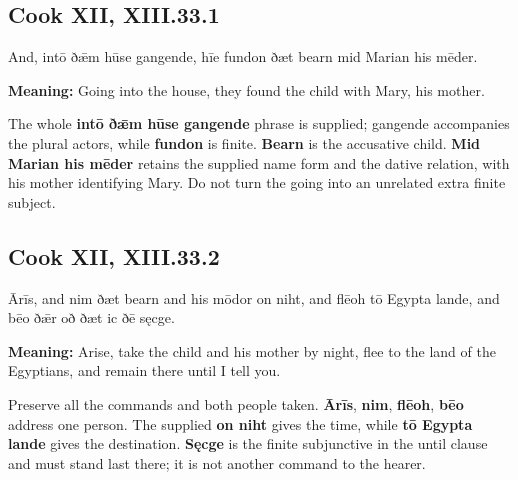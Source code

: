 \par\begin{minipage}{\linewidth}\raggedright
\subsection*{Cook XII, XIII.33.1}

And, intō ðǣm hūse gangende, hīe fundon ðæt bearn mid Marian his mēder.

\textbf{Meaning:} Going into the house, they found the child with Mary, his mother.

The whole \textbf{intō ðǣm hūse gangende} phrase is supplied; gangende accompanies the plural actors, while \textbf{fundon} is finite. \textbf{Bearn} is the accusative child. \textbf{Mid Marian his mēder} retains the supplied name form and the dative relation, with his mother identifying Mary. Do not turn the going into an unrelated extra finite subject.

\end{minipage}\par\addvspace{4pt}

\par\begin{minipage}{\linewidth}\raggedright
\subsection*{Cook XII, XIII.33.2}

Ārīs, and nim ðæt bearn and his mōdor on niht, and flēoh tō Egypta lande, and bēo ðǣr oð ðæt ic ðē sęcge.

\textbf{Meaning:} Arise, take the child and his mother by night, flee to the land of the Egyptians, and remain there until I tell you.

Preserve all the commands and both people taken. \textbf{Ārīs}, \textbf{nim}, \textbf{flēoh}, \textbf{bēo} address one person. The supplied \textbf{on niht} gives the time, while \textbf{tō Egypta lande} gives the destination. \textbf{Sęcge} is the finite subjunctive in the until clause and must stand last there; it is not another command to the hearer.

\end{minipage}\par\addvspace{4pt}

